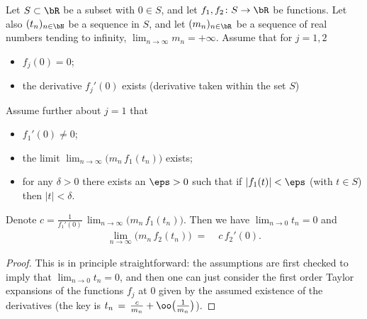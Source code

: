 \begin{lemma}
  \label{lem:modify-limit-taylor}
  \leanok
  Let $S \subset \bR$ be a subset with $0 \in S$, and let $f_1, f_2 \colon S \to \bR$ be
  functions. Let also $(t_n)_{n \in \bN}$ be a sequence in $S$,
  and let $(m_n)_{n \in \bR}$ be a sequence of real numbers tending to infinity,
  $\lim_{n \to \infty} m_n = +\infty$.
  Assume that for $j = 1,2$
  \begin{itemize}
    \item $f_j(0)=0$;
    \item the derivative $f_j'(0)$ exists (derivative taken within the set $S$)
  \end{itemize}
  Assume further about $j = 1$ that
  \begin{itemize}
    \item $f_1'(0) \ne 0$;
    \item the limit $\lim_{n \to \infty} \big( m_n \, f_1 (t_n) \big)$ exists;
    \item for any $\delta > 0$ there exists an $\eps > 0$ such that
      if $|f_1(t)| < \eps$ (with $t \in S$) then $|t| < \delta$.
  \end{itemize}
  Denote $c = \frac{1}{f_1'(0)} \, \lim_{n \to \infty} \big( m_n \, f_1 (t_n) \big)$.
  Then we have $\lim_{n \to 0} t_n = 0$ and
  \begin{align*}
    \lim_{n \to \infty} \Big( m_n \, f_2 (t_n) \Big) \; = \; & c \, f_2'(0) .
  \end{align*}
\end{lemma}
\begin{proof}
  \leanok
  This is in principle straightforward:
  the assumptions are first checked to imply that $\lim_{n \to 0} t_n = 0$,
  and then one can just consider the first order Taylor expansions of the
  functions $f_j$ at $0$ given by the assumed existence of the derivatives
  (the key is $t_n \, = \, \frac{c}{m_n} + \oo \big(\frac{1}{m_n}\big)$).
\end{proof}

